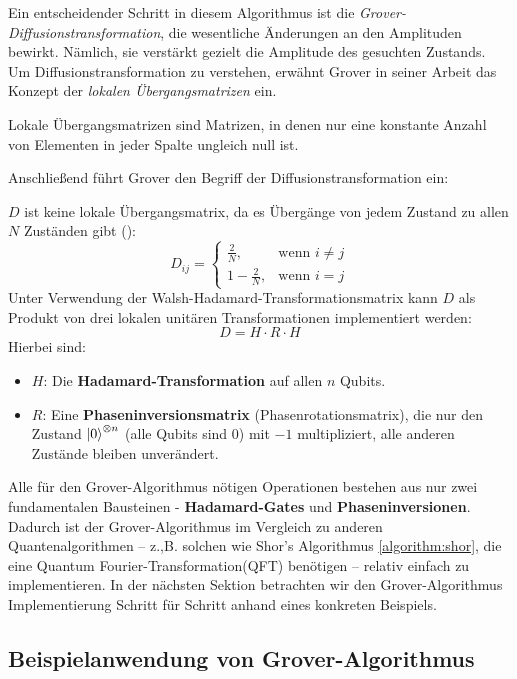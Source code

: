 Ein entscheidender Schritt in diesem Algorithmus ist die \textit{Grover-Diffusionstransformation}, die wesentliche Änderungen an den Amplituden bewirkt. Nämlich, sie verstärkt gezielt die Amplitude des gesuchten Zustands. Um Diffusionstransformation zu verstehen, erwähnt Grover in seiner Arbeit das Konzept der \textit{lokalen Übergangsmatrizen} ein.

\begin{definition}
Lokale Übergangsmatrizen sind Matrizen, in denen nur eine konstante Anzahl von Elementen in jeder Spalte ungleich null ist.
\end{definition}

Anschließend führt Grover den Begriff der Diffusionstransformation ein:

\begin{definition}
\( D \) ist keine lokale Übergangsmatrix, da es Übergänge von jedem Zustand zu allen \( N \) Zuständen gibt (\cite{zotero-1211}):
$$
D_{ij} = 
\begin{cases}
\frac{2}{N}, & \text{wenn } i \ne j \\
1 - \frac{2}{N}, & \text{wenn } i = j
\end{cases}
$$
Unter Verwendung der Walsh-Hadamard-Transformationsmatrix kann \( D \) als Produkt von drei lokalen unitären Transformationen implementiert werden:
$$
D = H \cdot R \cdot H
$$
Hierbei sind:
\begin{itemize}
\item $H$: Die \textbf{Hadamard-Transformation} auf allen $n$ Qubits.
\item $R$: Eine \textbf{Phaseninversionsmatrix} (Phasenrotationsmatrix), die nur den Zustand $\ket{0}^{\otimes n}$ (alle Qubits sind 0) mit $-1$ multipliziert, alle anderen Zustände bleiben unverändert.
\end{itemize}
\end{definition}

Alle für den Grover-Algorithmus nötigen Operationen bestehen aus nur zwei fundamentalen Bausteinen - \textbf{Hadamard-Gates} und \textbf{Phaseninversionen}. Dadurch ist der Grover-Algorithmus im Vergleich zu anderen Quantenalgorithmen – z.,B. solchen wie Shor's Algorithmus \ref{algorithm:shor}, die eine Quantum Fourier-Transformation(QFT) benötigen – relativ einfach zu implementieren. In der nächsten Sektion betrachten wir den Grover-Algorithmus Implementierung Schritt für Schritt anhand eines konkreten Beispiels.

\subsection{Beispielanwendung von Grover-Algorithmus}


